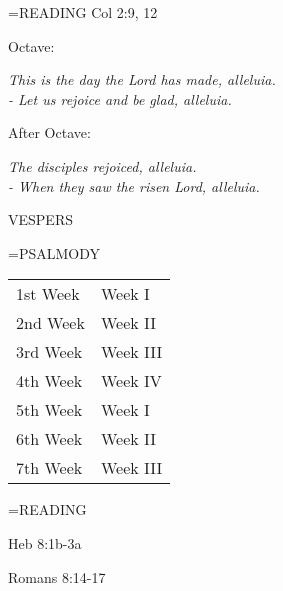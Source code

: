 \hangindent=\parindent \small{\uppercase{READING}}    Col 2:9, 12 \textbf{   \\}

\begin{center}
\end{center}Octave:\begin{center}\textit{	This is the day the Lord has made, alleluia.\\
- Let us rejoice and be glad, alleluia.}
\end{center}After Octave:\begin{center}\textit{	The disciples rejoiced, alleluia.\\
- When they saw the risen Lord, alleluia.}
\end{center}

\begin{flushleft}\normalsize VESPERS\\\end{flushleft}

\hangindent=\parindent \small{PSALMODY}
\begin{center}
\begin{tabular}{ l l }
1st Week &  Week I\\
2nd Week &  Week II\\
3rd Week &  Week III\\
4th Week &  Week IV\\
5th Week &  Week I\\
6th Week &  Week II\\
7th Week &  Week III\\
\end{tabular}
\end{center}		

\hangindent=\parindent \small READING
\begin{description}[labelindent=\parindent, leftmargin=*]
\item [1st-6th Week:]     Heb 8:1b-3a \textbf{    \\}
\item [7th Week:]     Romans 8:14-17 \textbf{    \\}
\end{description}
